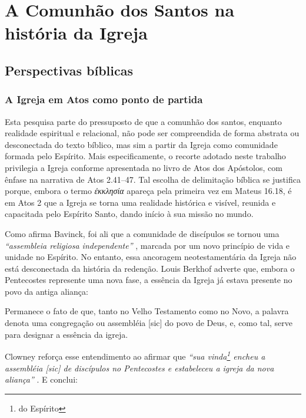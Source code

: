 \chapter{A Comunhão dos Santos na história da Igreja}

\section{Perspectivas bíblicas}

\subsection{A Igreja em Atos como ponto de partida}

Esta pesquisa parte do pressuposto de que a comunhão dos santos, enquanto realidade espiritual e relacional, não pode ser compreendida de forma abstrata ou desconectada do texto bíblico, mas sim a partir da Igreja como comunidade formada pelo Espírito. Mais especificamente, o recorte adotado neste trabalho privilegia a Igreja conforme apresentada no livro de Atos dos Apóstolos, com ênfase na narrativa de Atos 2.41–47. Tal escolha de delimitação bíblica se justifica porque, embora o termo \textit{\foreignlanguage{greek}{ἐκκλησία}} apareça pela primeira vez em Mateus 16.18, é em Atos 2 que a Igreja se torna uma realidade histórica e visível, reunida e capacitada pelo Espírito Santo, dando início à sua missão no mundo.

Como afirma Bavinck, foi ali que a comunidade de discípulos se tornou uma \textit{``assembleia religiosa independente''} \cite[p.~284]{bavinck2012}, marcada por um novo princípio de vida e unidade no Espírito. No entanto, essa ancoragem neotestamentária da Igreja não está desconectada da história da redenção. Louis Berkhof adverte que, embora o Pentecostes represente uma nova fase, a essência da Igreja já estava presente no povo da antiga aliança:

\begin{citacao}
    Permanece o fato de que, tanto no Velho Testamento como no Novo, a palavra denota uma congregação ou assembléia [sic] do povo de Deus, e, como tal, serve para designar a essência da igreja. \cite[p.~650]{berkhof2012}
\end{citacao}

Clowney reforça esse entendimento ao afirmar que \textit{``sua vinda\footnote{do Espírito} encheu a assembléia [sic] de discípulos no Pentecostes e estabeleceu a igreja da nova aliança''} \cite[p.~24]{clowney2007}. E conclui:


